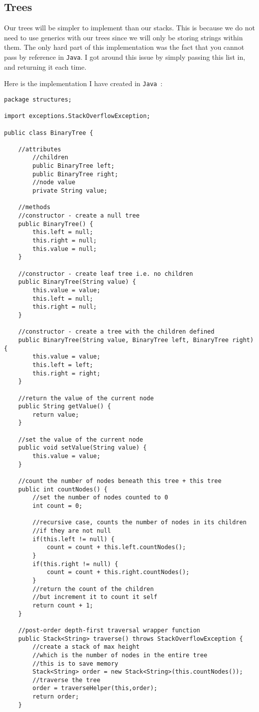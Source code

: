 \documentclass[../../../../../main.tex]{subfiles}
\begin{document}
\subsection{Trees}
Our trees will be simpler to implement than our stacks. This is because we do not need to use generics with our trees since we will only be storing strings within them. The only hard part of this implementation was the fact that you cannot pass by reference\cite{byRefJava} in \texttt{Java}. I got around this issue by simply passing this list in, and returning it each time.

Here is the implementation I have created in \texttt{Java
}:
\begin{verbatim}
package structures;

import exceptions.StackOverflowException;

public class BinaryTree {
	
	//attributes
		//children
		public BinaryTree left;
		public BinaryTree right;
		//node value
		private String value;
	
	//methods
	//constructor - create a null tree
	public BinaryTree() {
		this.left = null;
		this.right = null;
		this.value = null;
	}
	
	//constructor - create leaf tree i.e. no children
	public BinaryTree(String value) {
		this.value = value;
		this.left = null;
		this.right = null;
	}
	
	//constructor - create a tree with the children defined
	public BinaryTree(String value, BinaryTree left, BinaryTree right) {
		this.value = value;
		this.left = left;
		this.right = right;
	}
	
	//return the value of the current node
	public String getValue() {
		return value;
	}

	//set the value of the current node
	public void setValue(String value) {
		this.value = value;
	}
	
	//count the number of nodes beneath this tree + this tree
	public int countNodes() {
		//set the number of nodes counted to 0
		int count = 0;
		
		//recursive case, counts the number of nodes in its children
		//if they are not null
		if(this.left != null) {
			count = count + this.left.countNodes();
		}
		if(this.right != null) {
			count = count + this.right.countNodes();
		}
		//return the count of the children
		//but increment it to count it self
		return count + 1;
	}
	
	//post-order depth-first traversal wrapper function
	public Stack<String> traverse() throws StackOverflowException {
		//create a stack of max height
		//which is the number of nodes in the entire tree
		//this is to save memory
		Stack<String> order = new Stack<String>(this.countNodes());
		//traverse the tree
		order = traverseHelper(this,order);
		return order;
	}
	

\end{verbatim}
\end{document}
